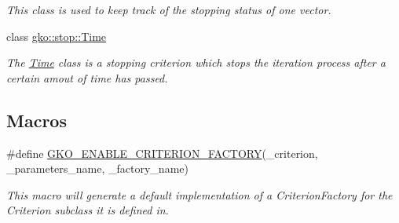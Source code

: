 \begin{DoxyCompactItemize}
\begin{DoxyCompactList}\small\item\em This class is used to keep track of the stopping status of one vector. \end{DoxyCompactList}\item 
class \hyperlink{classgko_1_1stop_1_1Time}{gko\+::stop\+::\+Time}
\begin{DoxyCompactList}\small\item\em The \hyperlink{classgko_1_1stop_1_1Time}{Time} class is a stopping criterion which stops the iteration process after a certain amout of time has passed. \end{DoxyCompactList}\end{DoxyCompactItemize}
\subsection*{Macros}
\begin{DoxyCompactItemize}
\item 
\#define \hyperlink{group__stop_ga5a998013602bad749e586a5664670cae}{G\+K\+O\+\_\+\+E\+N\+A\+B\+L\+E\+\_\+\+C\+R\+I\+T\+E\+R\+I\+O\+N\+\_\+\+F\+A\+C\+T\+O\+RY}(\+\_\+criterion,  \+\_\+parameters\+\_\+name,  \+\_\+factory\+\_\+name)
\begin{DoxyCompactList}\small\item\em This macro will generate a default implementation of a Criterion\+Factory for the Criterion subclass it is defined in. \end{DoxyCompactList}\end{DoxyCompactItemize}
